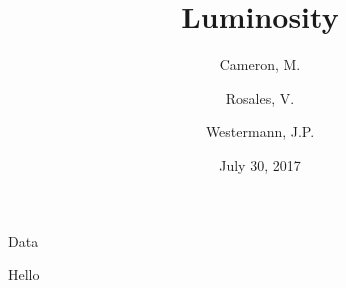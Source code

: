 \documentclass[12pt,fleqn,leqno,letterpaper]{article}
\title{Luminosity}
\author{
  Cameron, M.
  \and
  Rosales, V.
  \and
  Westermann, J.P.
}
\date{July 30, 2017}
\begin{document}
\maketitle

\newpage
\tableofcontents
\listoffigures
\listoftables

\newpage

\begin{section}{Data}
  \begin{subsection}{Hello}
  \end{subsection}
\end{section}


\end{document}
